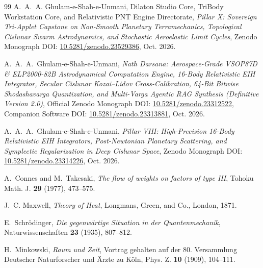 \documentclass[11pt,a4paper,reqno]{article}
\theoremstyle{plain}
\theoremstyle{definition}
\theoremstyle{remark}
\numberwithin{equation}{section}
\begin{document}
\begin{thebibliography}{99}
A.~A.~A. Ghulam-e-Shah-e-Unmani, {Dilaton Studio Core}, {TriBody Workstation Core}, and {Relativistic PNT Engine Directorate},
\textit{Pillar X: Sovereign Tri-Applet Capstone on Non-Smooth Planetary Terramechanics, Topological Cislunar Swarm Astrodynamics, and Stochastic Aeroelastic Limit Cycles},
Zenodo Monograph DOI: \href{https://doi.org/10.5281/zenodo.23529386}{10.5281/zenodo.23529386}, Oct. 2026.

A.~A.~A.~Ghulam-e-Shah-e-Unmani,
\textit{Nath Darsana: Aerospace-Grade VSOP87D \& ELP2000-82B Astrodynamical Computation Engine, 16-Body Relativistic EIH Integrator, Secular Cislunar Kozai--Lidov Cross-Calibration, 64-Bit Bitwise Shodashavarga Quantization, and Multi-Varga Agentic RAG Synthesis (Definitive Version 2.0)},
Official Zenodo Monograph DOI: \href{https://doi.org/10.5281/zenodo.23312522}{10.5281/zenodo.23312522},
Companion Software DOI: \href{https://doi.org/10.5281/zenodo.23313881}{10.5281/zenodo.23313881}, Oct. 2026.

A.~A.~A.~Ghulam-e-Shah-e-Unmani,
\textit{Pillar VIII: High-Precision 16-Body Relativistic EIH Integrators, Post-Newtonian Planetary Scattering, and Symplectic Regularization in Deep Cislunar Space},
Zenodo Monograph DOI: \href{https://doi.org/10.5281/zenodo.23314226}{10.5281/zenodo.23314226}, Oct. 2026.

A.~Connes and M.~Takesaki,
\textit{The flow of weights on factors of type III},
Tohoku Math. J. \textbf{29} (1977), 473--575.

J.~C. Maxwell,
\textit{Theory of Heat},
Longmans, Green, and Co., London, 1871.

E.~Schr\"{o}dinger,
\textit{Die gegenw\"{a}rtige Situation in der Quantenmechanik},
Naturwissenschaften \textbf{23} (1935), 807--812.

H.~Minkowski,
\textit{Raum und Zeit},
Vortrag gehalten auf der 80. Versammlung Deutscher Naturforscher und \"{A}rzte zu K\"{o}ln, Phys. Z. \textbf{10} (1909), 104--111.

\end{thebibliography}
\end{document}
